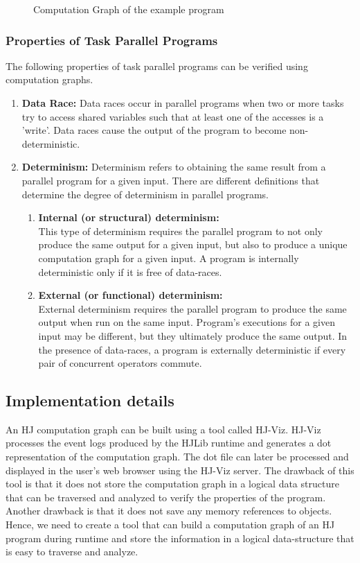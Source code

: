\begin{figure}[h!]
\begin{minipage}[b]{0.35\linewidth}
\caption{Computation Graph of the example program}
\label{fig:minipage2}
\end{minipage}
\end{figure}

\subsubsection{Properties of Task Parallel Programs}
The following properties of task parallel programs can be verified using computation graphs.

\begin{enumerate}
\item
\textbf{Data Race:}
Data races occur in parallel programs when two or more tasks try to access shared variables such that at least one of the accesses is a 'write'. Data races cause the output of the program to become non-deterministic. 
\item
\textbf{Determinism:}
Determinism refers to obtaining the same result from a parallel program for a given input. There are different definitions that determine the degree of determinism in parallel programs.
\begin{enumerate}
\item
\textbf{Internal (or structural) determinism:\\}
This type of determinism requires the parallel program to not only produce the same output for a given input, but also to produce a unique computation graph for a given input. A program is internally deterministic only if it is free of data-races.
\item
\textbf{External (or functional) determinism:\\}
External determinism requires the parallel program to produce the same output when run on the same input. Program's executions for a given input may be different, but they ultimately produce the same output. In the presence of data-races, a program is externally deterministic if every pair of concurrent operators commute.
\end{enumerate}
\end{enumerate}

\subsection{Implementation details}
An HJ computation graph can be built using a tool called HJ-Viz. HJ-Viz processes the event logs produced by the HJLib runtime and generates a dot representation of the computation graph. The dot file can later be processed and displayed in the user's web browser using the HJ-Viz server. The drawback of this tool is that it does not store the computation graph in a logical data structure that can be traversed and analyzed to verify the properties of the program. Another drawback is that it does not save any memory references to objects. Hence, we need to create a tool that can build a computation graph of an HJ program during runtime and store the information in a logical data-structure that is easy to traverse and analyze.

